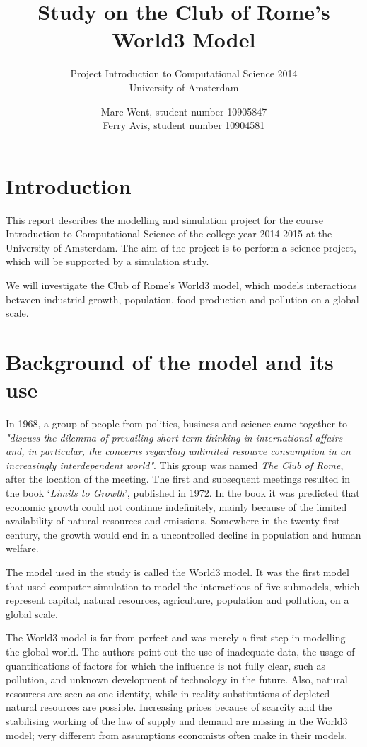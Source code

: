 \documentclass[10pt,a4paper]{scrartcl}
\title{Study on the Club of Rome's World3 Model}
\subtitle{Project Introduction to Computational Science 2014\\
University of Amsterdam}
\author{Marc Went, student number 10905847\\Ferry Avis, student number 10904581}
\begin{document}
\maketitle

\section*{Introduction}

This report describes the modelling and simulation project for the course Introduction to Computational Science of the college year 2014-2015 at the University of Amsterdam. The aim of the project is to perform a science project, which will be supported by a simulation study.

We will investigate the Club of Rome's World3 model, which models interactions between industrial growth, population, food production and pollution on a global scale. 

\section*{Background of the model and its use}

In 1968, a group of people from politics, business and science came together to \emph{"discuss the dilemma of prevailing short-term thinking in international affairs and, in particular, the concerns regarding unlimited resource consumption in an increasingly interdependent world"}. This group was named \emph{The Club of Rome}, after the location of the meeting. The first and subsequent meetings resulted in the book `\emph{Limits to Growth}', published in 1972. In the book it was predicted that economic growth could not continue indefinitely, mainly because of the limited availability of natural resources and emissions. Somewhere in the twenty-first century, the growth would end in a uncontrolled decline in population and human welfare.

The model used in the study is called the World3 model. It was the first model that used computer simulation to model the interactions of five submodels, which represent capital, natural resources, agriculture, population and pollution, on a global scale.

The World3 model is far from perfect and was merely a first step in modelling the global world. The authors point out the use of inadequate data, the usage of quantifications of factors for which the influence is not fully clear, such as pollution, and unknown development of technology in the future. Also, natural resources are seen as one identity, while in reality substitutions of depleted natural resources are possible. Increasing prices because of scarcity and the stabilising working of the law of supply and demand are missing in the World3 model; very different from assumptions economists often make in their models.
\end{document}
